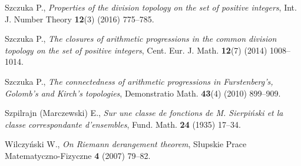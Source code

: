 \documentclass{amsart}
\theoremstyle{definition}
\theoremstyle{definition}
\begin{document}
\begin{thebibliography}{abc}
Szczuka P., \emph{Properties of the division topology on the set of positive integers},
Int. J. Number Theory {\bf 12}(3) (2016) 775--785.

Szczuka P., \emph{The closures of arithmetic progressions in the common division topology on the set of positive integers},
Cent. Eur. J. Math. {\bf 12}(7) (2014) 1008--1014.

Szczuka P., \emph{The connectedness of arithmetic progressions in Furstenberg's, Golomb's and Kirch's topologies},
Demonstratio Math. {\bf 43}(4) (2010) 899--909.

Szpilrajn (Marczewski) E., \emph{Sur une classe de fonctions de M. Sierpi\'nski et la classe correspondante d'ensembles},
Fund. Math. {\bf 24} (1935) 17--34.

Wilczy\'nski W., \emph{On Riemann derangement theorem},
S\l{}upskie Prace Matematyczno-Fizyczne {\bf 4} (2007) 79--82.

\end{thebibliography}
\end{document}

